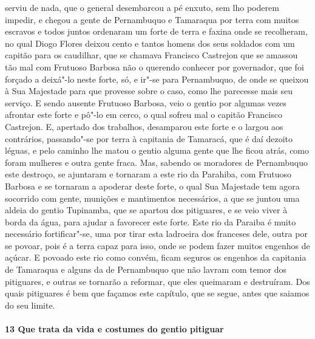 serviu de nada, que o general desembarcou a pé enxuto, sem lho poderem impedir, e chegou a
gente de Pernambuquo e Tamaraqua por terra com muitos escravos e todos juntos ordenaram um
forte de terra e faxina onde se recolheram, no qual Diogo Flores deixou cento e tantos
homens dos seus soldados com um capitão para os caudilhar, que se chamava Francisco
Castrejon que se amassou tão mal com Frutuoso Barbosa não o querendo conhecer por
governador, que foi forçado a deixá"-lo neste forte, só, e ir"-se para Pernambuquo, de onde
se queixou à Sua Majestade para que provesse sobre o caso, como lhe parecesse mais seu
serviço. E sendo ausente Frutuoso Barbosa, veio o gentio por algumas vezes afrontar este
forte e pô"-lo em cerco, o qual sofreu mal o capitão Francisco Castrejon. E, apertado dos
trabalhos, desamparou este forte e o largou aos contrários, passando"-se por terra à
capitania de Tamaracá, que é daí dezoito léguas, e pelo caminho lhe matou o gentio alguma
gente que lhe ficou atrás, como foram mulheres e outra gente fraca. Mas, sabendo os
moradores de Pernambuquo este destroço, se ajuntaram e tornaram a este rio da Parahiba,
com Frutuoso Barbosa e se tornaram a apoderar deste forte, o qual Sua Majestade tem agora
socorrido com gente, munições e mantimentos necessários, a que se juntou uma aldeia do
gentio Tupinamba, que se apartou dos pitiguares, e se veio viver à borda da água, para
ajudar a favorecer este forte. Este rio da Paraiba é muito necessário fortificar"-se, uma
por tirar esta ladroeira dos franceses dele, outra por se povoar, pois é a terra capaz
para isso, onde se podem fazer muitos engenhos de açúcar. E povoado este rio como convém,
ficam seguros os engenhos da capitania de Tamaraqua e alguns da de Pernambuquo que não
lavram com temor dos pitiguares, e outras se tornarão a reformar, que eles queimaram e
destruíram. Dos quais pitiguares é bem que façamos este capítulo, que se segue, antes que
saiamos do seu limite.

\paragraph{13 Que trata da vida e costumes do gentio pitiguar}

